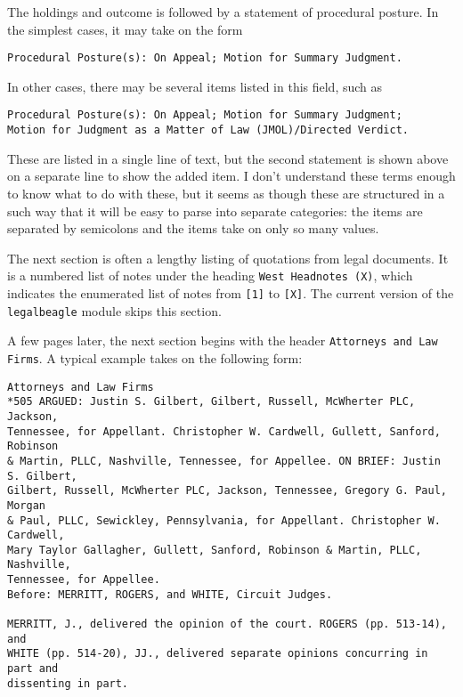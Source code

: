 \documentclass[11pt]{paper}
\begin{document}
The holdings and outcome is followed by a statement of procedural posture. 
In the simplest cases, it may take on the form
\begin{verbatim}
Procedural Posture(s): On Appeal; Motion for Summary Judgment.
\end{verbatim}
% 
In other cases, there may be several items listed in this field, such as
\begin{verbatim}
Procedural Posture(s): On Appeal; Motion for Summary Judgment; 
Motion for Judgment as a Matter of Law (JMOL)/Directed Verdict.
\end{verbatim}
% 
These are listed in a single line of text, but the second statement is shown 
above on a separate line to show the added item. 
I don't understand these terms enough to know what to do with these, but it 
seems as though these are structured in a such way that it will be easy 
to parse into separate categories: the items are separated by semicolons 
and the items take on only so many values. 

The next section is often a lengthy listing of quotations from legal documents. 
It is a numbered list of notes under the heading \texttt{West Headnotes (X)}, 
which indicates the enumerated list of notes from \texttt{[1]} to \texttt{[X]}. 
The current version of the \texttt{legalbeagle} module skips this section. 

A few pages later, the next section begins with the header 
\texttt{Attorneys and Law Firms}. 
A typical example takes on the following form:
%
\begin{verbatim}
Attorneys and Law Firms
*505 ARGUED: Justin S. Gilbert, Gilbert, Russell, McWherter PLC, Jackson, 
Tennessee, for Appellant. Christopher W. Cardwell, Gullett, Sanford, Robinson 
& Martin, PLLC, Nashville, Tennessee, for Appellee. ON BRIEF: Justin S. Gilbert, 
Gilbert, Russell, McWherter PLC, Jackson, Tennessee, Gregory G. Paul, Morgan 
& Paul, PLLC, Sewickley, Pennsylvania, for Appellant. Christopher W. Cardwell, 
Mary Taylor Gallagher, Gullett, Sanford, Robinson & Martin, PLLC, Nashville, 
Tennessee, for Appellee.
Before: MERRITT, ROGERS, and WHITE, Circuit Judges.

MERRITT, J., delivered the opinion of the court. ROGERS (pp. 513-14), and 
WHITE (pp. 514-20), JJ., delivered separate opinions concurring in part and 
dissenting in part.

\end{verbatim}
%
\end{document}
